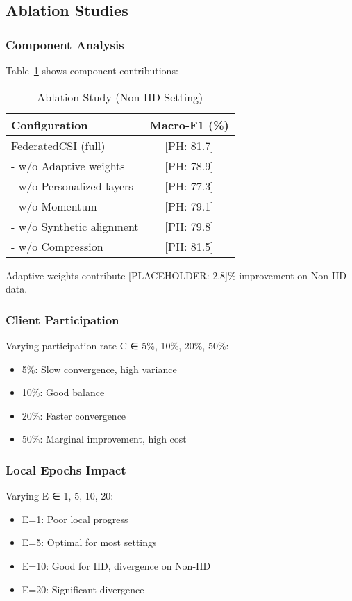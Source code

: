 \documentclass[journal]{IEEEtran}
\begin{document}
\subsection{Ablation Studies}

\subsubsection{Component Analysis}
Table~\ref{tab:ablation} shows component contributions:

\begin{table}[h]
\centering
\caption{Ablation Study (Non-IID Setting)}
\label{tab:ablation}
\begin{tabular}{lc}
\toprule
Configuration & Macro-F1 (\%) \\
\midrule
FederatedCSI (full) & [PH: 81.7] \\
- w/o Adaptive weights & [PH: 78.9] \\
- w/o Personalized layers & [PH: 77.3] \\
- w/o Momentum & [PH: 79.1] \\
- w/o Synthetic alignment & [PH: 79.8] \\
- w/o Compression & [PH: 81.5] \\
\bottomrule
\end{tabular}
\end{table}

Adaptive weights contribute [PLACEHOLDER: 2.8]\% improvement on Non-IID data.

\subsubsection{Client Participation}
Varying participation rate C ∈ {5\%, 10\%, 20\%, 50\%}:
\begin{itemize}
\item 5\%: Slow convergence, high variance
\item 10\%: Good balance
\item 20\%: Faster convergence
\item 50\%: Marginal improvement, high cost
\end{itemize}

\subsubsection{Local Epochs Impact}
Varying E ∈ {1, 5, 10, 20}:
\begin{itemize}
\item E=1: Poor local progress
\item E=5: Optimal for most settings
\item E=10: Good for IID, divergence on Non-IID
\item E=20: Significant divergence
\end{itemize}
\end{document}
